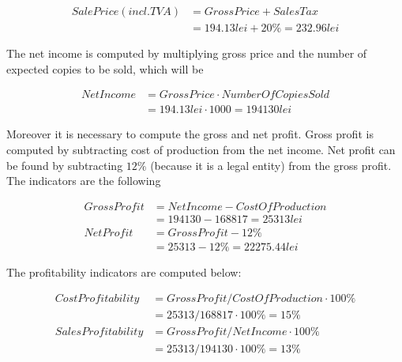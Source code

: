 \begin{equation}
 \begin{split}
  Sale Price (incl. TVA) &= Gross Price + Sales Tax\\
              &= 194.13 lei + 20\% = 232.96 lei
 \end{split}
\end{equation}

The net income is computed by multiplying gross price and the number of expected copies to be sold, which will be

\begin{equation}
 \begin{split}
  Net Income &= Gross Price \cdot Number Of Copies Sold\\
              &= 194.13 lei \cdot 1000 = 194130 lei
 \end{split}
\end{equation}

Moreover it is necessary to compute the gross and net profit. Gross profit is computed by subtracting cost of production from the net income. Net profit can be found by subtracting $12\%$ (because it is a legal entity) from the gross profit. The indicators are the following

\begin{equation}
 \begin{split}
  Gross Profit &= Net Income - Cost Of Production\\
              &= 194130 - 168817 = 25313 lei\\              
  Net Profit &= Gross Profit - 12\% \\
             &= 25313 - 12\% = 22275.44 lei
 \end{split}
\end{equation}

The profitability indicators are computed below:

\begin{equation}
 \begin{split}
  Cost Profitability &= Gross Profit / Cost Of Production \cdot 100\%\\
              &= 25313 / 168817 \cdot 100\% = 15 \%\\              
  SalesProfitability &= Gross Profit / Net Income \cdot 100\% \\
             &= 25313 / 194130 \cdot 100\% = 13 \%\\
 \end{split}
\end{equation}

